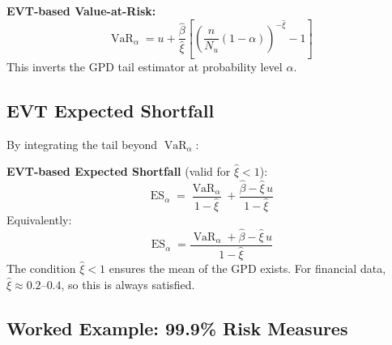 \documentclass[11pt, a4paper]{article}
\theoremstyle{definition}
\theoremstyle{plain}
\theoremstyle{remark}
\newcommand{\VaR}{\operatorname{VaR}}
\newcommand{\ES}{\operatorname{ES}}
\begin{document}
\begin{keyidea}
\textbf{EVT-based Value-at-Risk:}
\[
    \VaR_\alpha = u + \frac{\hat\beta}{\hat\xi}
    \left[\left(\frac{n}{N_u}(1-\alpha)\right)^{-\hat\xi} - 1\right]
\]
This inverts the GPD tail estimator at probability level $\alpha$.
\end{keyidea}

\subsection{EVT Expected Shortfall}

By integrating the tail beyond $\VaR_\alpha$:

\begin{keyidea}
\textbf{EVT-based Expected Shortfall} (valid for $\hat\xi < 1$):
\[
    \ES_\alpha = \frac{\VaR_\alpha}{1 - \hat\xi} + \frac{\hat\beta - \hat\xi \, u}{1 - \hat\xi}
\]
Equivalently:
\[
    \ES_\alpha = \frac{\VaR_\alpha + \hat\beta - \hat\xi \, u}{1 - \hat\xi}
\]
The condition $\hat\xi < 1$ ensures the mean of the GPD exists.
For financial data, $\hat\xi \approx 0.2$--$0.4$, so this is always satisfied.
\end{keyidea}

\subsection{Worked Example: 99.9\% Risk Measures}
\end{document}
